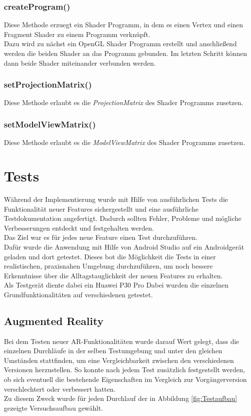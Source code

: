 \subsubsection{createProgram()}
Diese Methode erzuegt ein Shader Programm, in dem es einen Vertex und einen Fragment Shader zu einem Programm verknüpft.\\
Dazu wird zu nächst ein OpenGL Shader Programm erstellt und anschließend werden die beiden Shader an das Programm gebunden. 
Im letzten Schritt können dann beide Shader miteinander verbunden werden.

\subsubsection{setProjectionMatrix()}
Diese Methode erlaubt es die \textit{ProjectionMatrix} des Shader Programms zusetzen.

\subsubsection{setModelViewMatrix()}
Diese Methode erlaubt es die \textit{ModelViewMatrix} des Shader Programms zusetzen.


\section{Tests}\label{sec:Tests}
Während der Implementierung wurde mit Hilfe von ausführlichen Tests die Funktionalität neuer Features sichergestellt und eine ausführliche Testdokumentation angefertigt. Dadurch sollten Fehler, Probleme und mögliche Verbesserungen entdeckt und festgehalten werden. \\
Das Ziel war es für jedes neue Feature einen Test durchzuführen.\\
Dafür wurde die Anwendung mit Hilfe von Android Studio auf ein Androidgerät geladen und dort getestet.
Dieses bot die Möglichkeit die Tests in einer realistischen, praxisnahen Umgebung durchzuführen, um noch bessere Erkenntnisse über die Alltagstauglichkeit der neuen Features zu erhalten. \\
Als Testgerät diente dabei ein Huawei P30 Pro
Dabei wurden die einzelnen Grundfunktionalitäten auf verschiedenen getestet.

\subsection{Augmented Reality}\label{sec:Testdurchführung}
Bei dem Testen neuer AR-Funktionalitäten wurde darauf Wert gelegt, dass die einzelnen Durchläufe in der selben Testumgebung und unter den gleichen Umständen stattfinden, um eine Vergleichbarkeit zwischen den verschiedenen Versionen herzustellen.
So konnte nach jedem Test zusätzlich festgestellt werden, ob sich eventuell die bestehende Eigenschaften im Vergleich zur Vorgängerversion verschlechtert oder verbessert hatten. \\
Zu diesem Zweck wurde für jeden Durchlauf der in Abbildung \ref{fig:Testaufbau} gezeigte Versuchsaufbau gewählt.

